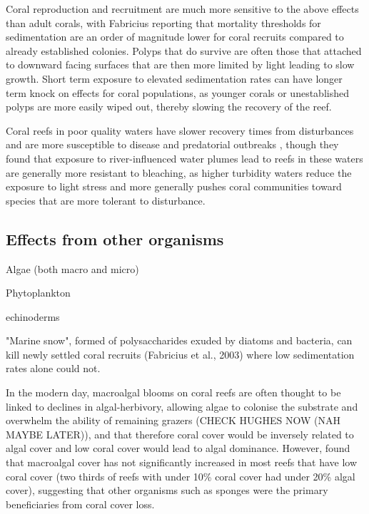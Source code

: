\documentclass[11pt,a4paper]{article}
\begin{document}

Coral reproduction and recruitment are much more sensitive to the above effects than adult corals, with Fabricius reporting that mortality thresholds for sedimentation are an order of magnitude lower for coral recruits compared to already established colonies.
 Polyps that do survive are often those that attached to downward facing surfaces that are then more limited by light leading to slow growth.
  Short term exposure to elevated sedimentation rates can have longer term knock on effects for coral populations, as younger corals or unestablished polyps are more easily wiped out, thereby slowing the recovery of the reef.

Coral reefs in poor quality waters have slower recovery times from disturbances and are more susceptible to disease and predatorial outbreaks \citep{MacNeil2019}, though they found that exposure to river-influenced water plumes lead to reefs in these waters are generally more resistant to bleaching, as higher turbidity waters reduce the exposure to light stress and more generally pushes coral communities toward species that are more tolerant to disturbance.  




\subsection{Effects from other organisms}

Algae (both macro and micro)

Phytoplankton

echinoderms

"Marine snow", formed of polysaccharides exuded by diatoms and bacteria, can kill newly settled coral recruits (Fabricius et al., 2003) where low sedimentation rates alone could not. 

In the modern day, macroalgal blooms on coral reefs are often thought to be linked to declines in algal-herbivory, allowing algae to colonise the substrate and overwhelm the ability of remaining grazers \citep{Williams2001,Hughes1999} (CHECK HUGHES NOW (NAH MAYBE LATER)), and that therefore coral cover would be inversely related to algal cover and low coral cover would lead to algal dominance.
 However, \cite{Bruno2007} found that macroalgal cover has not significantly increased in most reefs that have low coral cover (two thirds of reefs with under 10\% coral cover had under 20\% algal cover), suggesting that other organisms such as sponges were the primary beneficiaries from coral cover loss.
\end{document}
